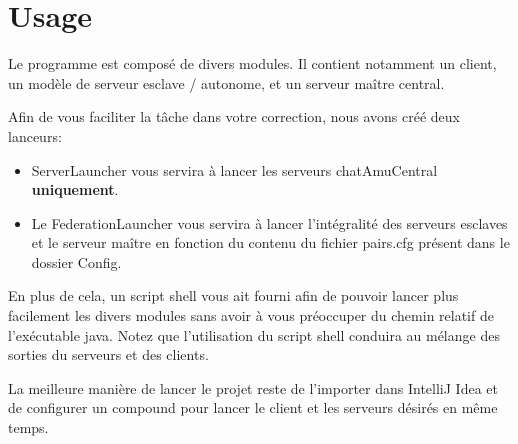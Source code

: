 \section{Usage}

Le programme est composé de divers modules. Il contient notamment un client, un modèle de serveur esclave / autonome, et un serveur maître central.

Afin de vous faciliter la tâche dans votre correction, nous avons créé deux lanceurs:

\begin{itemize}
\item ServerLauncher vous servira à lancer les serveurs chatAmuCentral \textbf{uniquement}.
\item Le FederationLauncher vous servira à lancer l'intégralité des serveurs esclaves et le serveur maître en fonction du contenu du fichier pairs.cfg présent dans le dossier Config.
\end{itemize}

En plus de cela, un script shell vous ait fourni afin de pouvoir lancer plus facilement les divers modules sans avoir à vous préoccuper du chemin relatif de l'exécutable java.
Notez que l'utilisation du script shell conduira au mélange des sorties du serveurs et des clients.

La meilleure manière de lancer le projet reste de l'importer dans IntelliJ Idea et de configurer un compound pour lancer le client et les serveurs désirés en même temps.
